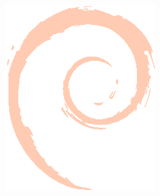 \begin{minipage}{.01\textwidth}
\includegraphics[width=100.\textwidth]{swirl}
\end{minipage}
%
\hfill
%
